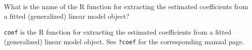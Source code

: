 
\begin{question}
What is the name of the R function for
extracting the estimated coefficients from a fitted (generalized) linear model object?
\end{question}

\begin{solution}
\texttt{coef} is the R function for
extracting the estimated coefficients from a fitted (generalized) linear model object.
See \texttt{?coef} for the corresponding manual page.
\end{solution}

